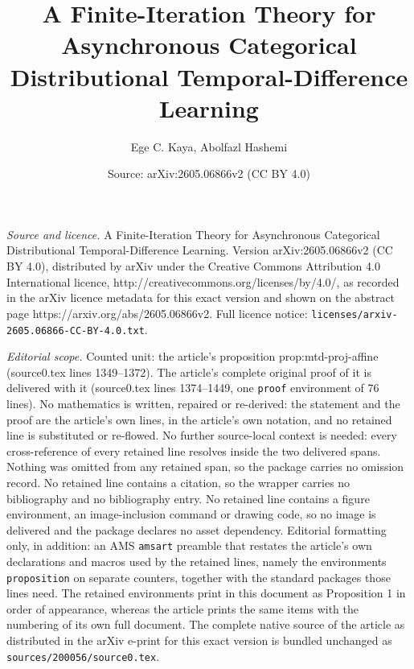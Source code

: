 \documentclass[10pt,a4paper]{amsart}
\title{A Finite-Iteration Theory for Asynchronous Categorical Distributional Temporal-Difference Learning}
\author{Ege C. Kaya, Abolfazl Hashemi}
\date{Source: arXiv:2605.06866v2 (CC BY 4.0)}
\begin{document}
\maketitle

\noindent\emph{Source and licence.} A Finite-Iteration Theory for Asynchronous Categorical Distributional Temporal-Difference Learning. Version arXiv:2605.06866v2 (CC BY 4.0), distributed by arXiv under the Creative Commons Attribution 4.0 International licence, http://creativecommons.org/licenses/by/4.0/, as recorded in the arXiv licence metadata for this exact version and shown on the abstract page https://arxiv.org/abs/2605.06866v2. Full licence notice: \texttt{licenses/arxiv-2605.06866-CC-BY-4.0.txt}.\par\smallskip

\noindent\textit{Editorial scope.} Counted unit: the article's proposition prop:mtd-proj-affine (source0.tex lines 1349--1372). The article's complete original proof of it is delivered with it (source0.tex lines 1374--1449, one \texttt{proof} environment of 76 lines). No mathematics is written, repaired or re-derived: the statement and the proof are the article's own lines, in the article's own notation, and no retained line is substituted or re-flowed.  No further source-local context is needed: every cross-reference of every retained line resolves inside the two delivered spans.  Nothing was omitted from any retained span, so the package carries no omission record.  No retained line contains a citation, so the wrapper carries no bibliography and no bibliography entry.  No retained line contains a figure environment, an image-inclusion command or drawing code, so no image is delivered and the package declares no asset dependency.  Editorial formatting only, in addition: an AMS \texttt{amsart} preamble that restates the article's own declarations and macros used by the retained lines, namely the environments \texttt{proposition} on separate counters, together with the standard packages those lines need.  The retained environments print in this document as Proposition 1 in order of appearance, whereas the article prints the same items with the numbering of its own full document.  The complete native source of the article as distributed in the arXiv e-print for this exact version is bundled unchanged as \texttt{sources/200056/source0.tex}.
\end{document}
